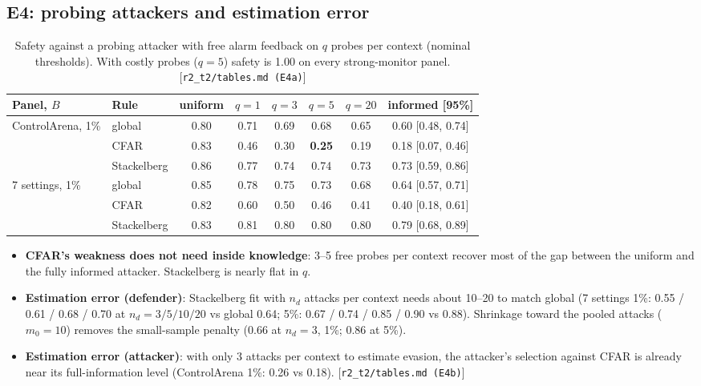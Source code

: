 \documentclass[11pt]{article}
\newcommand{\src}[1]{{\footnotesize\textcolor{ink2}{[\nolinkurl{#1}]}}}
\begin{document}
\subsection{E4: probing attackers and estimation error}
\begin{table}[!htb]\centering\small
\begin{adjustbox}{max width=\linewidth}\begin{tabular}{@{}llcccccc@{}}
\toprule
Panel, $B$ & Rule & uniform & $q=1$ & $q=3$ & $q=5$ & $q=20$ & informed [95\%]\\
\midrule
ControlArena, 1\% & global & 0.80 & 0.71 & 0.69 & 0.68 & 0.65 & 0.60 [0.48, 0.74]\\
& CFAR & 0.83 & 0.46 & 0.30 & \textbf{0.25} & 0.19 & 0.18 [0.07, 0.46]\\
& Stackelberg & 0.86 & 0.77 & 0.74 & 0.74 & 0.73 & 0.73 [0.59, 0.86]\\
7 settings, 1\% & global & 0.85 & 0.78 & 0.75 & 0.73 & 0.68 & 0.64 [0.57, 0.71]\\
& CFAR & 0.82 & 0.60 & 0.50 & 0.46 & 0.41 & 0.40 [0.18, 0.61]\\
& Stackelberg & 0.83 & 0.81 & 0.80 & 0.80 & 0.80 & 0.79 [0.68, 0.89]\\
\bottomrule
\end{tabular}\end{adjustbox}
\caption{Safety against a probing attacker with free alarm feedback on $q$ probes per context (nominal thresholds). With costly probes ($q=5$) safety is 1.00 on every strong-monitor panel. \src{r2_t2/tables.md (E4a)}}
\end{table}
\begin{itemize}
\item \textbf{CFAR's weakness does not need inside knowledge}: 3--5 free probes per context recover most of the gap between the uniform and the fully informed attacker. Stackelberg is nearly flat in $q$.
\item \textbf{Estimation error (defender)}: Stackelberg fit with $n_d$ attacks per context needs about 10--20 to match global (7 settings 1\%: 0.55 / 0.61 / 0.68 / 0.70 at $n_d=3/5/10/20$ vs global 0.64; 5\%: 0.67 / 0.74 / 0.85 / 0.90 vs 0.88). Shrinkage toward the pooled attacks ($m_0=10$) removes the small-sample penalty (0.66 at $n_d=3$, 1\%; 0.86 at 5\%).
\item \textbf{Estimation error (attacker)}: with only 3 attacks per context to estimate evasion, the attacker's selection against CFAR is already near its full-information level (ControlArena 1\%: 0.26 vs 0.18). \src{r2_t2/tables.md (E4b)}
\end{itemize}
\end{document}
